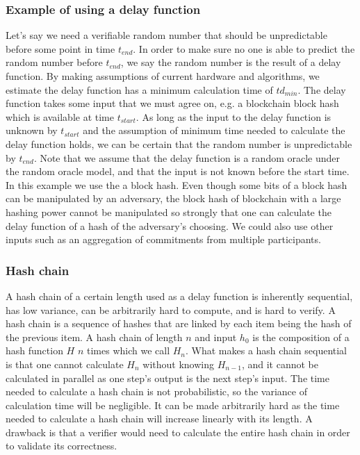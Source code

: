 \subsubsection{Example of using a delay function}
Let's say we need a verifiable random number that should be unpredictable before some point in time $t_{end}$. In order to make sure no one is able to predict the random number before $t_{end}$, we say the random number is the result of a delay function. By making assumptions of current hardware and algorithms, we estimate the delay function has a minimum calculation time of $td_{min}$. The delay function takes some input that we must agree on, e.g. a blockchain block hash which is available at time $t_{start}$. As long as the input to the delay function is unknown by $t_{start}$ and the assumption of minimum time needed to calculate the delay function holds, we can be certain that the random number is unpredictable by $t_{end}$. Note that we assume that the delay function is a random oracle under the random oracle model, and that the input is not known before the start time. In this example we use the a block hash. Even though some bits of a block hash can be manipulated by an adversary, the block hash of blockchain with a large hashing power cannot be manipulated so strongly that one can calculate the delay function of a hash of the adversary's choosing. We could also use other inputs such as an aggregation of commitments from multiple participants.

\subsubsection{Hash chain}
A hash chain of a certain length used as a delay function is inherently sequential, has low variance, can be arbitrarily hard to compute, and is hard to verify. A hash chain is a sequence of hashes that are linked by each item being the hash of the previous item. A hash chain of length $n$ and input $h_0$ is the composition of a hash function $H$ $n$ times which we call $H_n$. What makes a hash chain sequential is that one cannot calculate $H_n$ without knowing $H_{n-1}$, and it cannot be calculated in parallel as one step's output is the next step's input. The time needed to calculate a hash chain is not probabilistic, so the variance of calculation time will be negligible. It can be made arbitrarily hard as the time needed to calculate a hash chain will increase linearly with its length. A drawback is that a verifier would need to calculate the entire hash chain in order to validate its correctness. 


